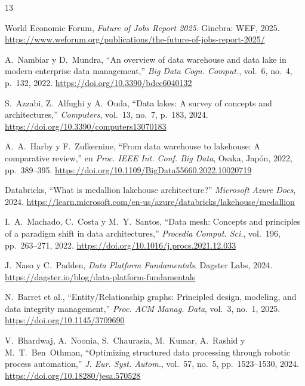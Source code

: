 \documentclass[10pt,twocolumn,spanish]{IEEEtran}
\begin{document}
\begin{thebibliography}{13}
\begin{sloppypar}

World Economic Forum,
\textit{Future of Jobs Report 2025}.
Ginebra: WEF, 2025.\\
\url{https://www.weforum.org/publications/the-future-of-jobs-report-2025/}

A.~Nambiar y D.~Mundra,
``An overview of data warehouse and data lake in modern enterprise data management,''
\textit{Big Data Cogn. Comput.}, vol.~6, no.~4, p.~132, 2022.
\url{https://doi.org/10.3390/bdcc6040132}

S.~Azzabi, Z.~Alfughi y A.~Ouda,
``Data lakes: A survey of concepts and architectures,''
\textit{Computers}, vol.~13, no.~7, p.~183, 2024.
\url{https://doi.org/10.3390/computers13070183}

A.~A.~Harby y F.~Zulkernine,
``From data warehouse to lakehouse: A comparative review,''
en \textit{Proc. IEEE Int. Conf. Big Data}, Osaka, Japón, 2022, pp.~389--395.
\url{https://doi.org/10.1109/BigData55660.2022.10020719}

Databricks,
``What is medallion lakehouse architecture?''
\textit{Microsoft Azure Docs}, 2024.
\url{https://learn.microsoft.com/en-us/azure/databricks/lakehouse/medallion}

I.~A.~Machado, C.~Costa y M.~Y.~Santos,
``Data mesh: Concepts and principles of a paradigm shift in data
architectures,''
\textit{Procedia Comput. Sci.}, vol.~196, pp.~263--271, 2022.
\url{https://doi.org/10.1016/j.procs.2021.12.033}

J.~Naso y C.~Padden,
\textit{Data Platform Fundamentals}.
Dagster Labs, 2024.
\url{https://dagster.io/blog/data-platform-fundamentals}

N.~Barret et al.,
``Entity/Relationship graphs: Principled design, modeling, and data
integrity management,''
\textit{Proc. ACM Manag. Data}, vol.~3, no.~1, 2025.
\url{https://doi.org/10.1145/3709690}

V.~Bhardwaj, A.~Noonia, S.~Chaurasia, M.~Kumar, A.~Rashid
y M.~T.~Ben~Othman,
``Optimizing structured data processing through robotic process
automation,''
\textit{J. Eur. Syst. Autom.}, vol.~57, no.~5, pp.~1523--1530, 2024.
\url{https://doi.org/10.18280/jesa.570528}


\end{sloppypar}
\end{thebibliography}
\end{document}
